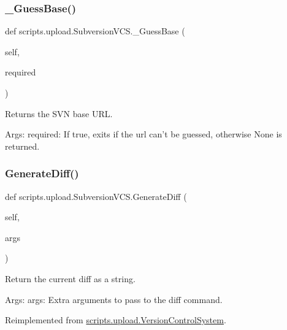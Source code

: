 \subsubsection{\texorpdfstring{\_GuessBase()}{\_GuessBase()}}
{\footnotesize\ttfamily def scripts.\+upload.\+Subversion\+V\+C\+S.\+\_\+\+Guess\+Base (\begin{DoxyParamCaption}\item[{}]{self,  }\item[{}]{required }\end{DoxyParamCaption})\hspace{0.3cm}{\ttfamily [private]}}

\begin{DoxyVerb}Returns the SVN base URL.

Args:
  required: If true, exits if the url can't be guessed, otherwise None is
returned.
\end{DoxyVerb}
 \mbox{\label{classscripts_1_1upload_1_1_subversion_v_c_s_a2fc2b2cf2f05b53694a28326338870e5}} 
\subsubsection{\texorpdfstring{GenerateDiff()}{GenerateDiff()}}
{\footnotesize\ttfamily def scripts.\+upload.\+Subversion\+V\+C\+S.\+Generate\+Diff (\begin{DoxyParamCaption}\item[{}]{self,  }\item[{}]{args }\end{DoxyParamCaption})}

\begin{DoxyVerb}Return the current diff as a string.

Args:
  args: Extra arguments to pass to the diff command.
\end{DoxyVerb}
 

Reimplemented from \mbox{\hyperlink{classscripts_1_1upload_1_1_version_control_system_ac687c3bb7840db1b27f323ca8d63c89b}{scripts.\+upload.\+Version\+Control\+System}}.

\mbox{\label{classscripts_1_1upload_1_1_subversion_v_c_s_a8b2d91ae013cd586191a010c16bfa0b8}} 
